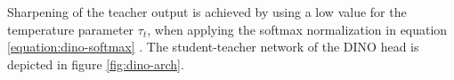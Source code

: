Sharpening of the teacher output is achieved by using a low value for the temperature parameter $\tau_t$, when applying the softmax normalization in equation \ref{equation:dino-softmax} \citep{Caron2021}.
The student-teacher network of the DINO head is depicted in figure \ref{fig:dino-arch}.
